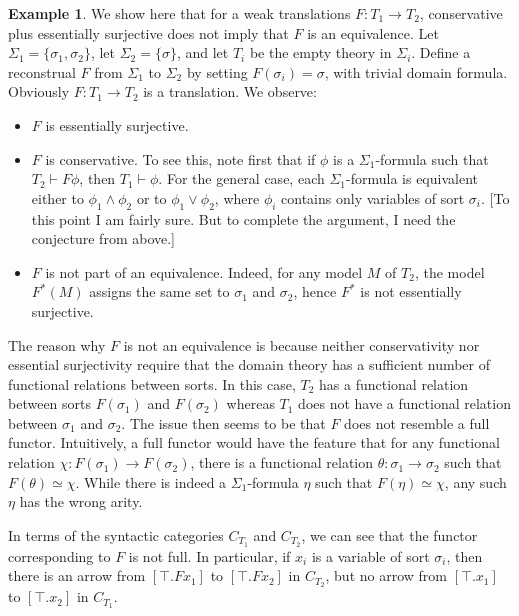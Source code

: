 \documentclass[12pt]{article}
\theoremstyle{definition}
\newtheorem{example}[prop]{Example}
\theoremstyle{remark}
\newcommand{\3}{\mathcal}
\begin{document}
\begin{example} \label{nope} We show here that for a weak translations
  $F:T_1\to T_2$, conservative plus essentially surjective does not
  imply that $F$ is an equivalence. Let
  $\Sigma _1 = \{ \sigma _1,\sigma _2\}$, let
  $\Sigma _2= \{ \sigma \}$, and let $T_i$ be the empty theory in
  $\Sigma _i$. Define a reconstrual $F$ from $\Sigma _1$ to
  $\Sigma _2$ by setting $F(\sigma _i)=\sigma$, with trivial domain
  formula. Obviously $F:T_1\to T_2$ is a translation. We observe:
  \begin{itemize}
  \item $F$ is essentially surjective.
  \item $F$ is conservative. To see this, note first that if $\phi$ is
    a $\Sigma _1$-formula such that $T_2\vdash F\phi $, then
    $T_1\vdash \phi$. For the general case, each $\Sigma _1$-formula
    is equivalent either to $\phi _1\wedge \phi _2$ or to
    $\phi _1\vee \phi _2$, where $\phi _i$ contains only variables of
    sort $\sigma _i$. [To this point I am fairly sure. But to complete
    the argument, I need the conjecture from above.]
 
  \item $F$ is not part of an equivalence. Indeed, for any model $M$
    of $T_2$, the model $F^*(M)$ assigns the same set to $\sigma _1$
    and $\sigma _2$, hence $F^*$ is not essentially surjective.
  \end{itemize}
  The reason why $F$ is not an equivalence is because neither
  conservativity nor essential surjectivity require that the domain
  theory has a sufficient number of functional relations between
  sorts. In this case, $T_2$ has a functional relation between sorts
  $F(\sigma _1)$ and $F(\sigma _2)$ whereas $T_1$ does not have a
  functional relation between $\sigma _1$ and $\sigma _2$.  The issue
  then seems to be that $F$ does not resemble a full
  functor. Intuitively, a full functor would have the feature that for
  any functional relation $\chi :F(\sigma _1)\to F(\sigma _2)$, there
  is a functional relation $\theta :\sigma _1\to \sigma _2$ such that
  $F(\theta )\simeq \chi$. While there is indeed a $\Sigma _1$-formula
  $\eta$ such that $F(\eta )\simeq \chi$, any such $\eta$ has the
  wrong arity.

  In terms of the syntactic categories $C_{T_1}$ and $C_{T_2}$, we can
  see that the functor corresponding to $F$ is not full. In
  particular, if $x_i$ is a variable of sort $\sigma _i$, then there
  is an arrow from $[\top .Fx_1]$ to $[\top .Fx_2]$ in $C_{T_2}$, but
  no arrow from $[\top .x_1]$ to $[\top .x_2]$ in
  $C_{T_1}$.  \end{example}
\end{document}
